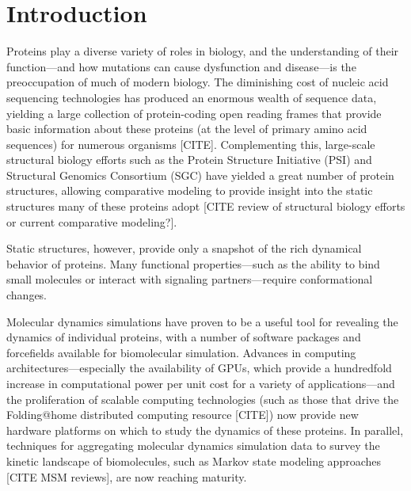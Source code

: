 \documentclass[aps,pre,twocolumn,nofootinbib,superscriptaddress,linenumbers]{revtex4-1}
\begin{document}
\maketitle

\section{Introduction}
\label{section:introduction}

Proteins play a diverse variety of roles in biology, and the understanding of their function---and how mutations can cause dysfunction and disease---is the preoccupation of much of modern biology. 
The diminishing cost of nucleic acid sequencing technologies has produced an enormous wealth of sequence data, yielding a large collection of protein-coding open reading frames that provide basic information about these proteins (at the level of primary amino acid sequences) for numerous organisms [CITE]. 
Complementing this, large-scale structural biology efforts such as the Protein Structure Initiative (PSI) and Structural Genomics Consortium (SGC) have yielded a great number of protein structures, allowing comparative modeling to provide insight into the static structures many of these proteins adopt [CITE review of structural biology efforts or current comparative modeling?].

Static structures, however, provide only a snapshot of the rich dynamical behavior of proteins.
Many functional properties---such as the ability to bind small molecules or interact with signaling partners---require conformational changes.

Molecular dynamics simulations have proven to be a useful tool for revealing the dynamics of individual proteins, with a number of software packages and forcefields available for biomolecular simulation.
Advances in computing architectures---especially the availability of GPUs, which provide a hundredfold increase in computational power per unit cost for a variety of applications---and the proliferation of scalable computing technologies (such as those that drive the Folding@home distributed computing resource [CITE]) now provide new hardware platforms on which to study the dynamics of these proteins.
In parallel, techniques for aggregating molecular dynamics simulation data to survey the kinetic landscape of biomolecules, such as Markov state modeling approaches [CITE MSM reviews], are now reaching maturity.
\end{document}
